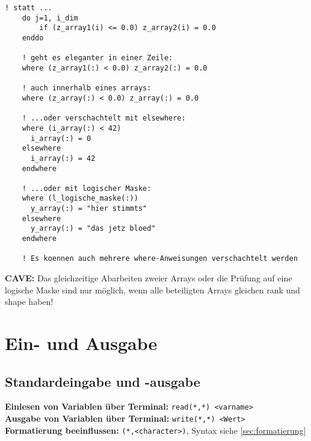 \documentclass[a4paper, twocolumn]{scrarticle}
\begin{document}
\begin{lstlisting}[caption={\bfseries where-Statement als Ersatz für do-if in Feldern},language=Fortran95Konkret]
	! statt ...
	do j=1, i_dim
		if (z_array1(i) <= 0.0) z_array2(i) = 0.0
	enddo
	
	! geht es eleganter in einer Zeile:
	where (z_array1(:) < 0.0) z_array2(:) = 0.0
	
	! auch innerhalb eines arrays:
	where (z_array(:) < 0.0) z_array(:) = 0.0
	
	! ...oder verschachtelt mit elsewhere:
	where (i_array(:) < 42)
	  i_array(:) = 0
	elsewhere
	  i_array(:) = 42
	endwhere
	
	! ...oder mit logischer Maske:
	where (l_logische_maske(:))
	  y_array(:) = "hier stimmts"
	elsewhere
	  y_array(:) = "das jetz bloed"
	endwhere
	
	! Es koennen auch mehrere where-Anweisungen verschachtelt werden
\end{lstlisting}
\textbf{CAVE:} Das gleichzeitige Abarbeiten zweier Arrays oder die Prüfung auf eine logische Maske sind nur möglich, wenn alle beteiligten Arrays gleichen rank und shape haben!

\section{Ein- und Ausgabe}
\subsection{Standardeingabe und -ausgabe}
\textbf{Einlesen von Variablen über Terminal:} \lstinline|read(*,*) <varname>|\\
\textbf{Ausgabe von Variablen über Terminal:} \lstinline|write(*,*) <Wert>|\\
\textbf{Formatierung beeinflussen:} \lstinline|(*,<character>)|, Syntax siehe \cref{sec:formatierung}
\end{document}
